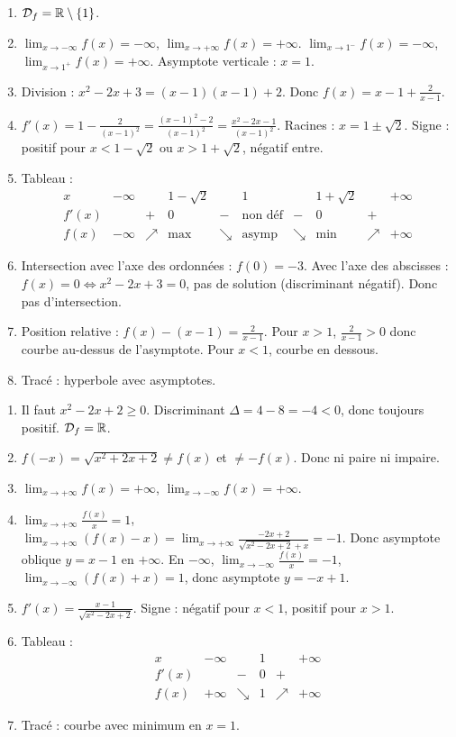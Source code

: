 \begin{enumerate}[label=\arabic*)]
\item \(\mathcal{D}_f=\mathbb{R}\setminus\{1\}\).
\item \(\lim_{x\to -\infty}f(x)=-\infty\), \(\lim_{x\to +\infty}f(x)=+\infty\). \(\lim_{x\to 1^-}f(x)=-\infty\), \(\lim_{x\to 1^+}f(x)=+\infty\). Asymptote verticale : \(x=1\).
\item Division : \(x^2-2x+3=(x-1)(x-1)+2\). Donc \(f(x)=x-1+\frac{2}{x-1}\).
\item \(f'(x)=1-\frac{2}{(x-1)^2}=\frac{(x-1)^2-2}{(x-1)^2}=\frac{x^2-2x-1}{(x-1)^2}\). Racines : \(x=1\pm\sqrt{2}\). Signe : positif pour \(x<1-\sqrt{2}\) ou \(x>1+\sqrt{2}\), négatif entre.
\item Tableau :
\[
\begin{array}{c|ccccccccccc}
x & -\infty & & 1-\sqrt{2} & & 1 & & 1+\sqrt{2} & & +\infty \\
\hline
f'(x) & & + & 0 & - & \text{non déf} & - & 0 & + & \\
\hline
f(x) & -\infty & \nearrow & \text{max} & \searrow & \text{asymp} & \searrow & \text{min} & \nearrow & +\infty
\end{array}
\]
\item Intersection avec l'axe des ordonnées : \(f(0)=-3\). Avec l'axe des abscisses : \(f(x)=0\iff x^2-2x+3=0\), pas de solution (discriminant négatif). Donc pas d'intersection.
\item Position relative : \(f(x)-(x-1)=\frac{2}{x-1}\). Pour \(x>1\), \(\frac{2}{x-1}>0\) donc courbe au-dessus de l'asymptote. Pour \(x<1\), courbe en dessous.
\item Tracé : hyperbole avec asymptotes.
\end{enumerate}

\begin{enumerate}[label=\arabic*)]
\item Il faut \(x^2-2x+2\ge0\). Discriminant \(\Delta=4-8=-4<0\), donc toujours positif. \(\mathcal{D}_f=\mathbb{R}\).
\item \(f(-x)=\sqrt{x^2+2x+2}\neq f(x)\) et \(\neq -f(x)\). Donc ni paire ni impaire.
\item \(\lim_{x\to +\infty}f(x)=+\infty\), \(\lim_{x\to -\infty}f(x)=+\infty\).
\item \(\lim_{x\to +\infty}\frac{f(x)}{x}=1\), \(\lim_{x\to +\infty}(f(x)-x)=\lim_{x\to +\infty}\frac{-2x+2}{\sqrt{x^2-2x+2}+x}=-1\). Donc asymptote oblique \(y=x-1\) en \(+\infty\). En \(-\infty\), \(\lim_{x\to -\infty}\frac{f(x)}{x}=-1\), \(\lim_{x\to -\infty}(f(x)+x)=1\), donc asymptote \(y=-x+1\).
\item \(f'(x)=\frac{x-1}{\sqrt{x^2-2x+2}}\). Signe : négatif pour \(x<1\), positif pour \(x>1\).
\item Tableau :
\[
\begin{array}{c|ccccccccccc}
x & -\infty & & 1 & & +\infty \\
\hline
f'(x) & & - & 0 & + & \\
\hline
f(x) & +\infty & \searrow & 1 & \nearrow & +\infty
\end{array}
\]
\item Tracé : courbe avec minimum en \(x=1\).
\end{enumerate}

